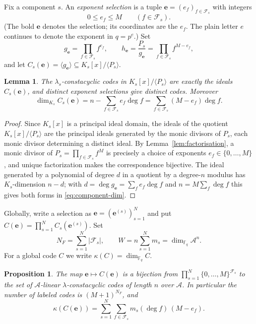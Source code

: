\documentclass[11pt,a4paper]{article}
\newcommand{\F}{\mathbb F}
\newcommand{\A}{\mathcal A}
\newcommand{\Fs}{\mathcal F_s}
\numberwithin{equation}{section}
\theoremstyle{plain}
\newtheorem{lemma}[theorem]{Lemma}
\newtheorem{proposition}[theorem]{Proposition}
\theoremstyle{definition}
\theoremstyle{remark}
\begin{document}
Fix a component $s$.  An \emph{exponent selection} is a tuple
$\mathbf{e}=(e_f)_{f\in\Fs}$ with integers
\[
0\leq e_f\leq M\qquad(f\in\Fs).
\]
(The bold $\mathbf{e}$ denotes the selection; its coordinates are the $e_f$.
The plain letter $e$ continues to denote the exponent in $q=p^e$.)  Set
\[
g_{\mathbf{e}}=\prod_{f\in\Fs}f^{e_f},
\qquad
h_{\mathbf{e}}=\frac{P_s}{g_{\mathbf{e}}}
   =\prod_{f\in\Fs}f^{M-e_f},
\]
and let $C_s(\mathbf{e})=\langle g_{\mathbf{e}}\rangle\subseteq
K_s[x]/\langle P_s\rangle$.

\begin{lemma}\label{lem:component-selection}
The $\lambda_s$-constacyclic codes in $K_s[x]/\langle P_s\rangle$ are exactly
the ideals $C_s(\mathbf{e})$, and distinct exponent selections give distinct
codes.  Moreover
\begin{equation}\label{eq:component-dim}
\dim_{K_s}C_s(\mathbf{e})
   =n-\sum_{f\in\Fs}e_f\deg f
   =\sum_{f\in\Fs}(M-e_f)\deg f .
\end{equation}
\end{lemma}

\begin{proof}
Since $K_s[x]$ is a principal ideal domain, the ideals of the quotient
$K_s[x]/\langle P_s\rangle$ are the principal ideals generated by the monic
divisors of $P_s$, each monic divisor determining a distinct ideal.  By
Lemma~\ref{lem:factorisation}, a monic divisor of
$P_s=\prod_{f\in\Fs}f^M$ is precisely a choice of exponents
$e_f\in\{0,\ldots,M\}$, and unique factorization makes the correspondence
bijective.  The ideal generated by a polynomial of degree $d$ in a quotient by a
degree-$n$ modulus has $K_s$-dimension $n-d$; with
$d=\deg g_{\mathbf{e}}=\sum_f e_f\deg f$ and $n=M\sum_f\deg f$ this gives both
forms in \eqref{eq:component-dim}.
\end{proof}

Globally, write a selection as
$\mathbf{e}=(\mathbf{e}^{(s)})_{s=1}^{N}$ and put
$C(\mathbf{e})=\prod_{s=1}^{N}C_s(\mathbf{e}^{(s)})$.  Set
\[
N_F=\sum_{s=1}^{N}|\Fs|,
\qquad
W=n\sum_{s=1}^{N}m_s=\dim_{\F_q}\A^n .
\]
For a global code $C$ we write $\kappa(C)=\dim_{\F_q}C$.

\begin{proposition}\label{prop:global-selection}
The map $\mathbf{e}\mapsto C(\mathbf{e})$ is a bijection from
$\prod_{s=1}^{N}\{0,\ldots,M\}^{\Fs}$ to the set of $\A$-linear
$\lambda$-constacyclic codes of length $n$ over $\A$.  In particular the number
of labeled codes is $(M+1)^{N_F}$, and
\begin{equation}\label{eq:kappa}
\kappa(C(\mathbf{e}))
   =\sum_{s=1}^{N}\sum_{f\in\Fs}m_s(\deg f)\,(M-e_f).
\end{equation}
\end{proposition}
\end{document}
